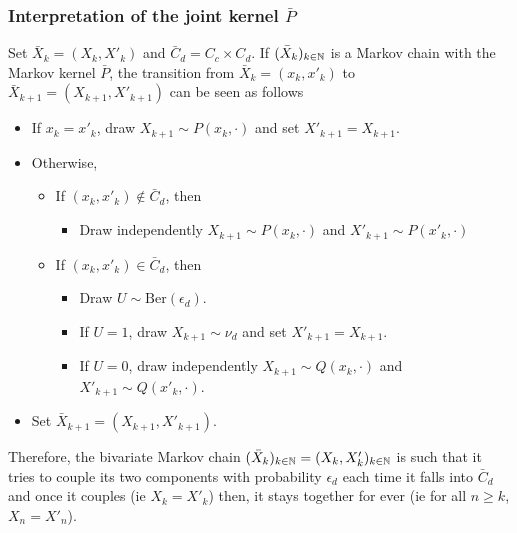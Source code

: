 \documentclass[english,graybox,envcountchap,envcountsame,sectrefs,shortlabels]{svmono}
\theoremstyle{style}
\begin{document}
\subsubsection*{Interpretation of the joint kernel $\bar P$}
Set $\bar X_k=(X_k,X'_k)$ and $\bar C_d=C_c\times C_d$. If $(\bar X_k)_{k\in\mathbb{N}}$ is a Markov chain with the Markov kernel $\bar P$, the transition from $\bar X_k=(x_k,x'_k)$ to $\bar X_{k+1}=(X_{k+1},X'_{k+1})$ can be seen as follows
\begin{itemize}
\item If $x_k=x'_k$, draw $X_{k+1}\sim P(x_k,\cdot)$ and set $X'_{k+1}=X_{k+1}$.
\item Otherwise,
\begin{itemize}
\item If $(x_k,x'_k) \notin \bar C_d$, then
\begin{itemize}
\item Draw independently $X_{k+1}\sim P(x_k,\cdot)$ and $X'_{k+1}\sim P(x'_k,\cdot)$
\end{itemize}
\item If $(x_k,x'_k) \in \bar C_d$, then
\begin{itemize}
\item Draw $U\sim \mathrm{Ber}(\epsilon_d)$.
\item If $U=1$, draw $X_{k+1}\sim \nu_d$ and set $X'_{k+1}=X_{k+1}$.
\item If $U=0$, draw independently $X_{k+1}\sim Q(x_k,\cdot)$ and $X'_{k+1}\sim Q(x'_k,\cdot)$.
\end{itemize}
\end{itemize}
\item Set $\bar X_{k+1}=(X_{k+1},X'_{k+1})$.
\end{itemize}
Therefore, the bivariate Markov chain $(\bar X_k)_{k\in\mathbb{N}}=(X_k,X'_k)_{k\in\mathbb{N}}$  is such that it tries to couple its two components with probability $\epsilon_d$ each time it falls into $\bar C_d$ and once it couples (ie $X_k=X'_k$) then, it stays together for ever (ie for all $n\geq k$, $X_n=X'_n$).
\end{document}
